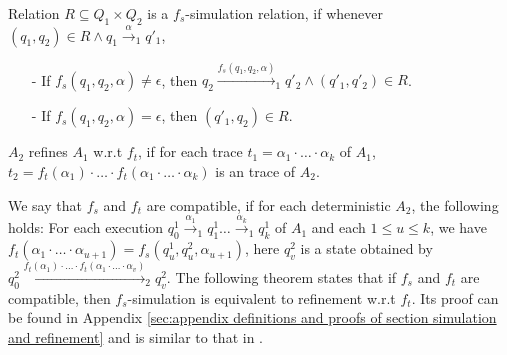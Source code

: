 
\begin{definition}[$f_s$-Simulation]
\label{definition:fs simulation}
Relation $R \subseteq Q_1 \times Q_2$ is a $f_s$-simulation relation, if whenever $(q_1,q_2) \in R \wedge q_1 {\xrightarrow{\alpha}}_1 q'_1$,
\begin{itemize}
\setlength{\itemsep}{0.5pt}
\item[-] If $f_s(q_1,q_2,\alpha) \neq \epsilon$, then $q_2 {\xrightarrow{f_s(q_1,q_2,\alpha)}}_1 q'_2 \wedge (q'_1,q'_2) \in R$.

\item[-] If $f_s(q_1,q_2,\alpha) = \epsilon$, then $(q'_1,q_2) \in R$.
\end{itemize}
\end{definition}


\begin{definition}[refinement w.r.t $f_t$]
\label{definition:ft refinement}
$A_2$ refines $A_1$ w.r.t $f_t$, if for each trace $t_1 = \alpha_1 \cdot \ldots \cdot \alpha_k$ of $A_1$, $t_2 = f_t(\alpha_1) \cdot \ldots \cdot f_t(\alpha_1 \cdot \ldots \cdot \alpha_k)$ is an trace of $A_2$.
\end{definition}



We say that $f_s$ and $f_t$ are compatible, if for each deterministic $A_2$, the following holds: For each execution %
$q_{0}^1 {\xrightarrow{\alpha_1}}_1 q_{1}^1 \ldots {\xrightarrow{\alpha_k}}_1 q_{k}^1$ of $A_1$ and each $1 \leq u \leq k$, we have $f_t(\alpha_1 \cdot \ldots \cdot \alpha_{u+1}) = f_s(q_{u}^1,q_{u}^2,\alpha_{u+1})$, here $q_v^2$ is a state obtained by $q_{0}^2 {\xrightarrow{f_t(\alpha_1) \cdot \ldots \cdot f_t(\alpha_1 \cdot \ldots \cdot \alpha_v) }}_2 q_v^2$. %
The following theorem states that if $f_s$ and $f_t$ are compatible, then $f_s$-simulation is equivalent to refinement w.r.t $f_t$. Its proof can be found in Appendix \ref{sec:appendix definitions and proofs of section simulation and refinement} and is similar to that in \cite{Abadi:1991,Lynch:1995}.

